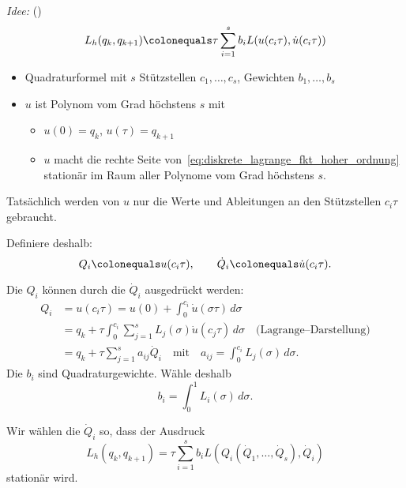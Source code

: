 \bigskip

\emph{Idee:} (\citet{marsden_west:2001})
\begin{equation}
\label{eq:diskrete_lagrange_fkt_hoher_ordnung}
 L_h (q_k, q_{k+1})
 \colonequals
 \tau \sum_{i=1}^s b_i L(u(c_i \tau), \dot{u}(c_i\tau))
\end{equation}
\begin{itemize}
 \item Quadraturformel mit $s$ Stützstellen $c_1, \dots, c_s$, Gewichten $b_1, \dots,b_s$

 \item $u$ ist Polynom vom Grad höchstens $s$ mit
 \begin{itemize}
  \item $u(0) = q_k$, \qquad $u(\tau) = q_{k+1}$
  \item $u$ macht die rechte Seite von~\eqref{eq:diskrete_lagrange_fkt_hoher_ordnung} stationär
    im Raum aller Polynome vom Grad höchstens $s$.
 \end{itemize}
\end{itemize}

\bigskip

Tatsächlich werden von $u$ nur die Werte und Ableitungen an den Stützstellen $c_i \tau$ gebraucht.

\medskip

Definiere deshalb:
\begin{equation*}
Q_i \colonequals u(c_i \tau), \quad\quad \dot{Q}_i \colonequals \dot{u}(c_i \tau).
\end{equation*}

\medskip

Die $Q_i$ können durch die $\dot{Q}_i$ ausgedrückt werden:
\begin{align}
\nonumber
Q_i &= u(c_i \tau) = u(0) + \int_0^{c_i} \dot{u}(\sigma\tau)\, d\sigma\\
\nonumber
 &=
 q_k + \tau\int_0^{c_i}\sum_{j=1}^s L_j(\sigma)\dot{u}(c_j\tau)\,d\sigma \quad\text{(Lagrange--Darstellung)}\\
\label{eq:vi_darstellung_der_Q}
 &=
 q_k + \tau\sum_{j=1}^s a_{ij}\dot{Q}_i \quad \text{mit}\quad a_{ij} = \int_0^{c_i} L_j(\sigma)\,d\sigma.
\end{align}
Die $b_i$ sind Quadraturgewichte.  Wähle deshalb
\begin{equation*}
b_i = \int_0^1 L_i(\sigma)\,d\sigma.
\end{equation*}

\bigskip

Wir wählen die $\dot{Q}_i$ so, dass der Ausdruck
\begin{equation*}
L_h(q_k, q_{k+1}) = \tau\sum_{i=1}^s b_iL(Q_i(\dot{Q}_1,\dots,\dot{Q}_s),\dot{Q}_i)
\end{equation*}
stationär wird.

